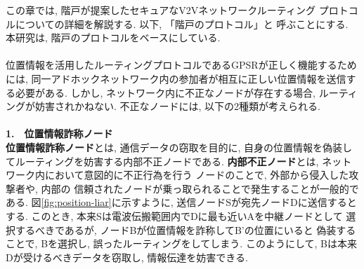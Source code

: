 この章では, 階戸\cite{shinato}が提案したセキュアなV2Vネットワークルーティング
プロトコルについての詳細を解説する. 以下, 「階戸のプロトコル」と
呼ぶことにする. 本研究は, 階戸のプロトコルをベースにしている.\\ 

\\[0.5em]
\indent 位置情報を活用したルーティングプロトコルであるGPSRが正しく機能するためには, 
同一アドホックネットワーク内の参加者が相互に正しい位置情報を送信する必要がある. 
しかし, ネットワーク内に不正なノードが存在する場合, ルーティングが妨害されかねない. 
不正なノードには, 以下の2種類が考えられる. \\[0.5em]
\\[0.5em]
\noindent \textbf{1.　位置情報詐称ノード}\\
\indent \textbf{位置情報詐称ノード}とは, 通信データの窃取を目的に, 
自身の位置情報を偽装してルーティングを妨害する内部不正ノードである. 
\textbf{内部不正ノード}とは, ネットワーク内において意図的に不正行為を行う
ノードのことで, 外部から侵入した攻撃者や, 内部の
信頼されたノードが乗っ取られることで発生することが一般的である. 
図\ref{fig:position-liar}に示すように, 送信ノードSが宛先ノードDに送信するとする. 
このとき, 本来Sは電波伝搬範囲内でDに最も近いAを中継ノードとして
選択するべきであるが, ノードBが位置情報を詐称してB'の位置にいると
偽装することで, Bを選択し, 誤ったルーティングをしてしまう. 
このようにして, Bは本来Dが受けるべきデータを窃取し, 
情報伝達を妨害できる.\\

